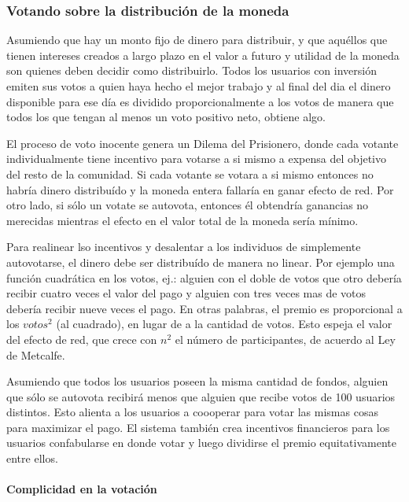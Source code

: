 \documentclass[a4paper,titlepage,final]{article}
\begin{document}
\subsubsection{Votando sobre la distribución de la moneda}

Asumiendo que hay un monto fijo de dinero para distribuir, y que aquéllos que tienen intereses creados a largo plazo en el valor a futuro y utilidad de la moneda son quienes deben decidir como distribuirlo. Todos los usuarios con inversión emiten sus votos a quien haya hecho el mejor trabajo y al final del dia el dinero disponible para ese día es dividido proporcionalmente a los votos de manera que todos los que tengan al menos un voto positivo neto, obtiene algo.

El proceso de voto inocente genera un Dilema del Prisionero, donde cada votante individualmente tiene incentivo para votarse a si mismo a expensa del objetivo del resto de la comunidad. Si cada votante se votara a si mismo entonces no habría dinero distribuído y la moneda entera fallaría en ganar efecto de red. Por otro lado, si sólo un votate se autovota, entonces él obtendría ganancias no merecidas mientras el efecto en el valor total de la moneda sería mínimo.

Para realinear lso incentivos y desalentar a los individuos de simplemente autovotarse, el dinero debe ser distribuído de manera no linear. Por ejemplo una función cuadrática en los votos, ej.: alguien con el doble de votos que otro debería recibir cuatro veces el valor del pago y alguien con tres veces mas de votos debería recibir nueve veces el pago. En otras palabras, el premio es proporcional a los $votos^2$ (al cuadrado), en lugar de a la cantidad de votos. Esto espeja el valor del efecto de red, que crece con \textit{$n^2$} el número de participantes, de acuerdo al Ley de Metcalfe\cite{5}.

Asumiendo que todos los usuarios poseen la misma cantidad de fondos, alguien que sólo se autovota recibirá menos que alguien que recibe votos de 100 usuarios distintos. Esto alienta a los usuarios a coooperar para votar las mismas cosas para maximizar el pago. El sistema también crea incentivos financieros para los usuarios confabularse en donde votar y luego dividirse el premio equitativamente entre ellos.

\paragraph{Complicidad en la votación}
\end{document}
